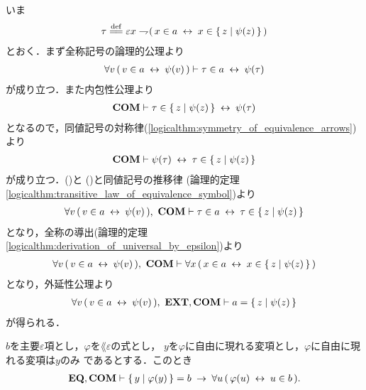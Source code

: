 	\begin{sketch}
		いま
		\begin{align}
			\tau \defeq 
			\varepsilon x \negation (\, x \in a \lrarrow x \in \Set{z}{\psi(z)}\, )
		\end{align}
		とおく．まず全称記号の論理的公理より
		\begin{align}
			\forall v\, (\, v \in a \hspace{0.25em}\leftrightarrow\hspace{0.25em} \psi(v)\, )
			\vdash \tau \in a \hspace{0.25em}\leftrightarrow\hspace{0.25em} \psi(\tau)
			\label{fom:equivalent_formula_rewriting_2_1}
		\end{align}
		が成り立つ．また内包性公理より
		\begin{align}
			\mbox{\bf COM} \vdash \tau \in \{\, z \mid \psi(z)\, \} \hspace{0.25em}\leftrightarrow\hspace{0.25em} \psi(\tau)
		\end{align}
		となるので，同値記号の対称律(\ref{logicalthm:symmetry_of_equivalence_arrows})より
		\begin{align}
			\mbox{\bf COM} \vdash \psi(\tau) \hspace{0.25em}\leftrightarrow\hspace{0.25em} \tau \in \{\, z \mid \psi(z)\, \}
			\label{fom:equivalent_formula_rewriting_2_2}
		\end{align}
		が成り立つ．()と
		()と同値記号の推移律
		(論理的定理\ref{logicalthm:transitive_law_of_equivalence_symbol})より
		\begin{align}
			\forall v\, (\, v \in a \hspace{0.25em}\leftrightarrow\hspace{0.25em} \psi(v)\, ),\ \mbox{\bf COM} \vdash
			\tau \in a \hspace{0.25em}\leftrightarrow\hspace{0.25em} \tau \in \{\, z \mid \psi(z)\, \}
		\end{align}
		となり，全称の導出(論理的定理\ref{logicalthm:derivation_of_universal_by_epsilon})より
		\begin{align}
			\forall v\, (\, v \in a \hspace{0.25em}\leftrightarrow\hspace{0.25em} \psi(v)\, ),\ \mbox{\bf COM} \vdash
			\forall x\, (\, x \in a \hspace{0.25em}\leftrightarrow\hspace{0.25em} x \in \{\, z \mid \psi(z)\, \}\, )
		\end{align}
		となり，外延性公理より
		\begin{align}
			\forall v\, (\, v \in a \hspace{0.25em}\leftrightarrow\hspace{0.25em} \psi(v)\, ),\ \mbox{{\bf EXT}},\mbox{\bf COM} \vdash
			a = \{\, z \mid \psi(z)\, \}
		\end{align}
		が得られる．
		\QED
	\end{sketch}
	
	\begin{screen}
		\begin{thm}
		\label{thm:equivalent_formula_rewriting_3}
			$b$を主要$\varepsilon$項とし，$\varphi$を$\lang{\varepsilon}$の式とし，
			$y$を$\varphi$に自由に現れる変項とし，$\varphi$に自由に現れる変項は$y$のみ
			であるとする．このとき
			\begin{align}
				\mbox{{\bf EQ}},\mbox{\bf COM} \vdash \{\, y \mid \varphi(y)\, \} = b 
				\hspace{0.25em}\rightarrow\hspace{0.25em} \forall u\, (\, \varphi(u) \hspace{0.25em}\leftrightarrow\hspace{0.25em} u \in b\, ).
			\end{align}
		\end{thm}
	\end{screen}
	
